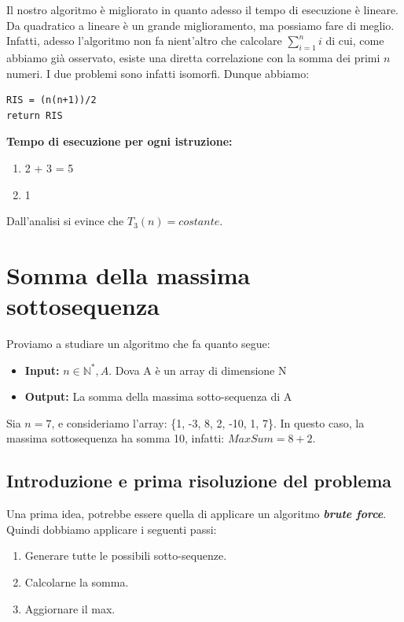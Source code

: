 Il nostro algoritmo è migliorato in quanto adesso il tempo di esecuzione è lineare. Da quadratico a lineare è un grande miglioramento, ma possiamo fare di meglio. Infatti, adesso l'algoritmo non fa nient'altro che calcolare $\displaystyle\sum_{i=1}^{n} i$ di cui, come abbiamo già osservato, esiste una diretta correlazione con la somma dei primi $n$ numeri. I due problemi sono infatti isomorfi. Dunque abbiamo:

\begin{lstlisting}[label = lst:Conta3, language=asd, caption={Conta3(n)}]
RIS = (n(n+1))/2
return RIS
\end{lstlisting}

\textbf{Tempo di esecuzione per ogni istruzione:}
\begin{enumerate}
  \item 2 + 3 = 5
  \item 1
\end{enumerate}

Dall'analisi si evince che $T_3(n) = costante$.


\section{Somma della massima sottosequenza}\label{sottosequenzecontigue}
Proviamo a studiare un algoritmo che fa quanto segue:
\begin{itemize}
    \item \textbf{Input:}  $n\in\mathbb{N}^*, A$. Dova A è un array di dimensione N
    \item \textbf{Output:} La somma della massima sotto-sequenza di A
\end{itemize}

\begin{example}
		Sia $n=7$, e consideriamo l'array: \{1, -3, 8, 2, -10, 1, 7\}. In questo caso, la massima sottosequenza ha somma 10, infatti: $MaxSum = 8+2$.
\end{example}

\subsection{Introduzione e prima risoluzione del problema}
Una prima idea, potrebbe essere quella di applicare un algoritmo \textit{\textbf{brute force}}.
Quindi dobbiamo applicare i seguenti passi:
\begin{enumerate}
    \item Generare tutte le possibili sotto-sequenze.
    \item Calcolarne la somma.
    \item Aggiornare il max.
\end{enumerate}

